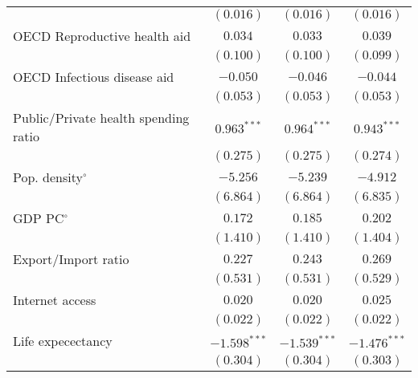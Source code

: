 \begin{sidewaystable}
\begin{center}
{\begin{tabular}{l@{} c@{} c@{} c@{}}
                                                             & $(0.016)$      & $(0.016)$      & $(0.016)$      \\
OECD Reproductive health aid                                 & $0.034$        & $0.033$        & $0.039$        \\
                                                             & $(0.100)$      & $(0.100)$      & $(0.099)$      \\
OECD Infectious disease aid                                  & $-0.050$       & $-0.046$       & $-0.044$       \\
                                                             & $(0.053)$      & $(0.053)$      & $(0.053)$      \\
Public/Private health spending ratio                         & $0.963^{***}$  & $0.964^{***}$  & $0.943^{***}$  \\
                                                             & $(0.275)$      & $(0.275)$      & $(0.274)$      \\
Pop. density$^{\circ}$                                       & $-5.256$       & $-5.239$       & $-4.912$       \\
                                                             & $(6.864)$      & $(6.864)$      & $(6.835)$      \\
GDP PC$^{\circ}$                                             & $0.172$        & $0.185$        & $0.202$        \\
                                                             & $(1.410)$      & $(1.410)$      & $(1.404)$      \\
Export/Import ratio                                          & $0.227$        & $0.243$        & $0.269$        \\
                                                             & $(0.531)$      & $(0.531)$      & $(0.529)$      \\
Internet access                                              & $0.020$        & $0.020$        & $0.025$        \\
                                                             & $(0.022)$      & $(0.022)$      & $(0.022)$      \\
Life expecectancy                                            & $-1.598^{***}$ & $-1.539^{***}$ & $-1.476^{***}$ \\
                                                             & $(0.304)$      & $(0.304)$      & $(0.303)$      \\

\end{tabular}}
\end{center}
\end{sidewaystable}
